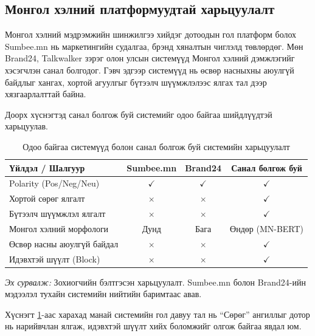 \subsection{Монгол хэлний платформуудтай харьцуулалт}

Монгол хэлний мэдрэмжийн шинжилгээ хийдэг дотоодын гол платформ болох
Sumbee.mn нь маркетингийн судалгаа, брэнд хяналтын чиглэлд төвлөрдөг. Мөн
Brand24, Talkwalker зэрэг олон улсын системүүд Монгол хэлний дэмжлэгийг
хэсэгчлэн санал болгодог. Гэвч эдгээр системүүд нь өсвөр насныхны аюулгүй
байдлыг хангах, хортой агуулгыг бүтээлч шүүмжлэлээс ялгах тал дээр
хязгаарлалттай байна.

Доорх хүснэгтэд санал болгож буй системийг одоо байгаа шийдлүүдтэй харьцуулав.

\begin{table}[H]
    \centering
    \caption{Одоо байгаа системүүд болон санал болгож буй системийн харьцуулалт}
    \label{tab:system-comparison}
    \begin{tabular}{@{}lccc@{}}
        \toprule
        \textbf{Үйлдэл / Шалгуур} & \textbf{Sumbee.mn} & \textbf{Brand24} & \textbf{Санал болгож буй} \\
        \midrule
        Polarity (Pos/Neg/Neu)       & $\checkmark$ & $\checkmark$ & $\checkmark$ \\
        Хортой сөрөг ялгалт          & $\times$     & $\times$     & $\checkmark$ \\
        Бүтээлч шүүмжлэл ялгалт     & $\times$     & $\times$     & $\checkmark$ \\
        Монгол хэлний морфологи      & Дунд         & Бага         & Өндөр (MN-BERT) \\
        Өсвөр насны аюулгүй байдал   & $\times$     & $\times$     & $\checkmark$ \\
        Идэвхтэй шүүлт (Block)       & $\times$     & $\times$     & $\checkmark$ \\
        \bottomrule
    \end{tabular}
    \par\vspace{4pt}
    \begin{minipage}{\linewidth}
      \footnotesize\textit{Эх сурвалж:} Зохиогчийн бэлтгэсэн харьцуулалт.
      Sumbee.mn болон Brand24-ийн мэдээлэл тухайн системийн нийтийн баримтаас авав.
    \end{minipage}
\end{table}
\medskip
Хүснэгт \ref{tab:system-comparison}-аас харахад манай системийн гол давуу тал нь
``Сөрөг'' ангиллыг дотор нь нарийвчлан ялгаж, идэвхтэй шүүлт хийх боломжийг
олгож байгаа явдал юм.

